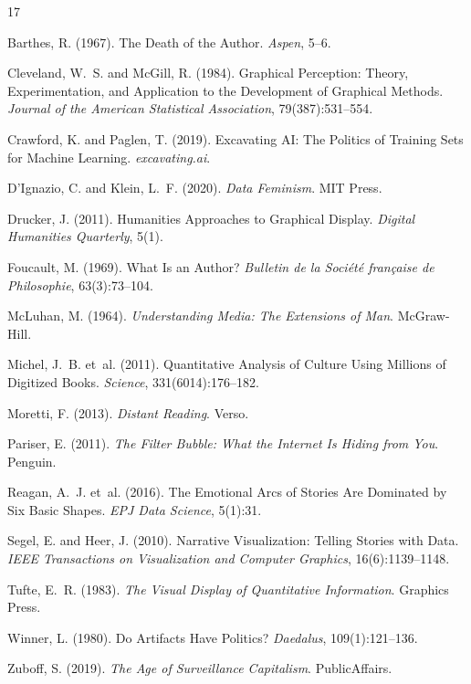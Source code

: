 \documentclass[11pt,a4paper]{article}
\begin{document}
\begin{thebibliography}{17}

Barthes, R. (1967).
\newblock The Death of the Author.
\newblock \emph{Aspen}, 5--6.

Cleveland, W.~S. and McGill, R. (1984).
\newblock Graphical Perception: Theory, Experimentation, and Application to the Development of Graphical Methods.
\newblock \emph{Journal of the American Statistical Association}, 79(387):531--554.

Crawford, K. and Paglen, T. (2019).
\newblock Excavating AI: The Politics of Training Sets for Machine Learning.
\newblock \emph{excavating.ai}.

D'Ignazio, C. and Klein, L.~F. (2020).
\newblock \emph{Data Feminism}.
\newblock MIT Press.

Drucker, J. (2011).
\newblock Humanities Approaches to Graphical Display.
\newblock \emph{Digital Humanities Quarterly}, 5(1).

Foucault, M. (1969).
\newblock What Is an Author?
\newblock \emph{Bulletin de la Soci\'et\'e fran\c{c}aise de Philosophie}, 63(3):73--104.

McLuhan, M. (1964).
\newblock \emph{Understanding Media: The Extensions of Man}.
\newblock McGraw-Hill.

Michel, J.~B. et~al. (2011).
\newblock Quantitative Analysis of Culture Using Millions of Digitized Books.
\newblock \emph{Science}, 331(6014):176--182.

Moretti, F. (2013).
\newblock \emph{Distant Reading}.
\newblock Verso.

Pariser, E. (2011).
\newblock \emph{The Filter Bubble: What the Internet Is Hiding from You}.
\newblock Penguin.

Reagan, A.~J. et~al. (2016).
\newblock The Emotional Arcs of Stories Are Dominated by Six Basic Shapes.
\newblock \emph{EPJ Data Science}, 5(1):31.

Segel, E. and Heer, J. (2010).
\newblock Narrative Visualization: Telling Stories with Data.
\newblock \emph{IEEE Transactions on Visualization and Computer Graphics}, 16(6):1139--1148.

Tufte, E.~R. (1983).
\newblock \emph{The Visual Display of Quantitative Information}.
\newblock Graphics Press.

Winner, L. (1980).
\newblock Do Artifacts Have Politics?
\newblock \emph{Daedalus}, 109(1):121--136.

Zuboff, S. (2019).
\newblock \emph{The Age of Surveillance Capitalism}.
\newblock PublicAffairs.

\end{thebibliography}
\end{document}
